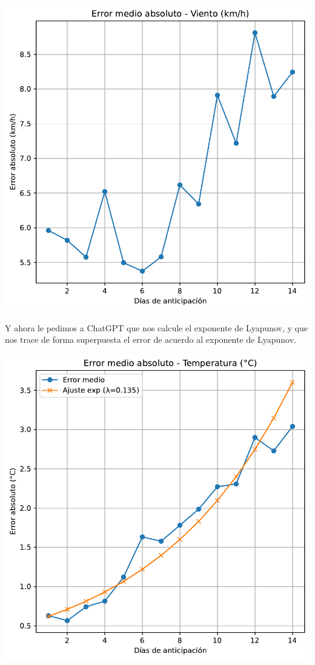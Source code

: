 \documentclass[
  10pt,
  a4paper,
  DIV=11,
  numbers=noendperiod,
  open=any]{scrreprt}
\makeatletter
\newcommand*\pandocbounded[1]{%
  \sbox\pandoc@box{#1}%
  \Gscale@div\@tempa{\textheight}{\dimexpr\ht\pandoc@box+\dp\pandoc@box\relax}%
  \Gscale@div\@tempb{\linewidth}{\wd\pandoc@box}%
  \ifdim\@tempb\p@<\@tempa\p@\let\@tempa\@tempb\fi%
  \ifdim\@tempa\p@<\p@\scalebox{\@tempa}{\usebox\pandoc@box}%
  \else\usebox{\pandoc@box}%
  \fi%
}
\numberwithin{equation}{chapter}
\numberwithin{equation}{section}
\renewcommand{\[}{\begin{equation}}
\renewcommand{\]}{\end{equation}}
\providecommand{\pandocbounded}[1]{#1}%
\renewcommand{\pandocbounded}[1]{\begingroup\centering #1\par\endgroup}
\makeatother
\begin{document}
\pandocbounded{\includegraphics[keepaspectratio]{03-meteorologia/predicciones_files/figure-pdf/cell-3-output-4.pdf}}

Y ahora le pedimos a ChatGPT que nos calcule el exponente de Lyapunov, y
que nos trace de forma superpuesta el error de acuerdo al exponente de
Lyapunov.

\pandocbounded{\includegraphics[keepaspectratio]{03-meteorologia/predicciones_files/figure-pdf/cell-4-output-1.pdf}}
\end{document}
